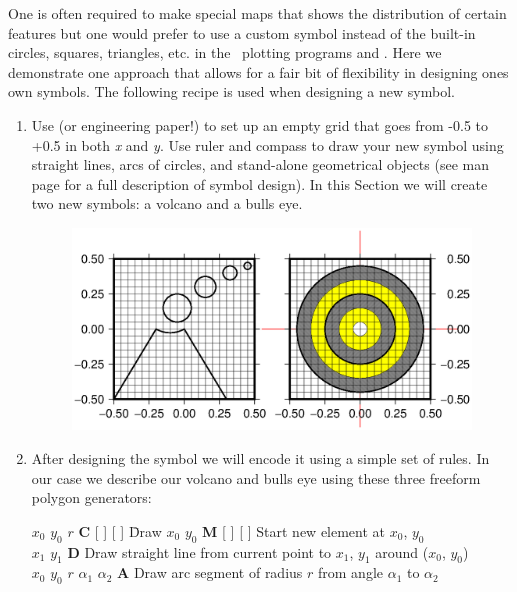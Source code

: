 One is often required to make special maps that shows the
distribution of certain features but one would prefer to
use a custom symbol instead of the built-in circles,
squares, triangles, etc. in the \GMT\ plotting programs
 and .  Here we demonstrate one
approach that allows for a fair bit of flexibility in
designing ones own symbols.  The following recipe is used
when designing a new symbol.
\begin{enumerate}
\item Use  (or
engineering paper!) to set up an empty grid that goes from
-0.5 to +0.5 in both {\it x} and {\it y}.  Use ruler and
compass to draw your new symbol using straight lines,
arcs of circles, and stand-alone geometrical objects (see  man page for
a full description of symbol design).  In this Section we will create two new symbols:
a volcano and a bulls eye.

\begin{figure}[ht]
   \centering\includegraphics{scripts/GMT_volcano}
\end{figure}

\item After designing the symbol we will encode it using a
simple set of rules.  In our case we describe our volcano and bulls eye
using these three freeform polygon generators:

\begin{tabbing} 
$x_0$ $y_0$ $r$ {\bf C} [  ] [  ] \=Draw \kill
$x_0$ $y_0$ {\bf M} [  ] [  ] \> Start new element at $x_0$, $y_0$ \\ 
$x_1$ $y_1$ {\bf D} \> Draw straight line from current point to $x_1$, $y_1$ around ($x_0$, $y_0$) \\ 
$x_0$ $y_0$ $r$ $\alpha_1$ $\alpha_2$ {\bf A} \> Draw
arc segment of radius $r$ from angle $\alpha_1$ to $\alpha_2$
\end{tabbing} 


\end{enumerate}

